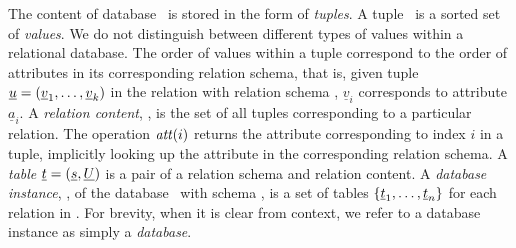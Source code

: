 

The content of database \pDB\ is stored in the form of \emph{tuples}. A tuple
\pTuple\ is a sorted set of \emph{values}. We do not distinguish between
different types of values within a relational database.
%
The order of values within a tuple correspond to the order of attributes in its corresponding
relation schema, that is, given tuple $\pTuple = \paran {\vi {\underline v} k}$
in the relation with relation schema \vRel {},
$\underline{v}_i$ corresponds to attribute $\underline{a}_i$.
%
A \emph{relation content}, \pRelCont, is the set of all tuples  corresponding to a particular relation.
%
The operation $\getAtt {i}$ returns the attribute corresponding to index $i$ in
a tuple, implicitly looking up the attribute in the corresponding relation
schema.
%
A \emph{table} \ensuremath{\pTab = \left(\pRelSch, \pRelCont\right)} is a pair
of a relation schema and relation content.
%
A \emph{database instance}, \pInst, of the database \pDB\ with schema \pSch, is
a set of tables $\setDef {\pTab_1, \ldots, \pTab_n}$ for each relation in
\pSch.
For brevity, when it is clear from context, we refer to a database instance as
simply a \emph{database}.


